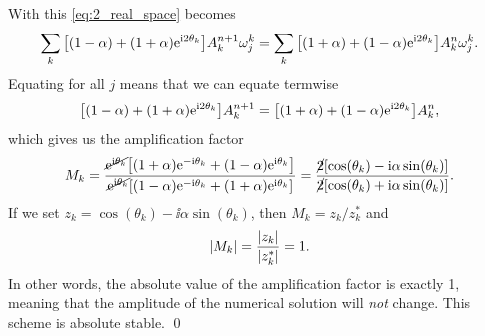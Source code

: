 \documentclass[11pt,letter, swedish, english
]{article}
\begin{document}
With this \eqref{eq:2_real_space} becomes
\begin{equation}
\sum_k\qty[(1-\alpha)+(1+\alpha)\mathrm{e}^{\mathrm{i}2\theta_k}]
A_k^{n+1}\omega_j^k
=\sum_k\qty[(1+\alpha)+(1-\alpha)\mathrm{e}^{\mathrm{i}2\theta_k}]
A_k^{n}\omega_j^k.
\end{equation}
Equating for all $j$ means that we can equate termwise
\begin{equation}
\qty[(1-\alpha)+(1+\alpha)\mathrm{e}^{\mathrm{i}2\theta_k}]A_k^{n+1}
=\qty[(1+\alpha)+(1-\alpha)\mathrm{e}^{\mathrm{i}2\theta_k}]A_k^{n},
\end{equation}
which gives us the amplification factor
\begin{equation}
M_k=\frac{\cancel{\mathrm{e}^{\mathrm{i}\theta_k}}
\qty[(1+\alpha)\mathrm{e}^{-\mathrm{i}\theta_k}+(1-\alpha)\mathrm{e}^{\mathrm{i}\theta_k}]}
{\cancel{\mathrm{e}^{\mathrm{i}\theta_k}}
\qty[(1-\alpha)\mathrm{e}^{-\mathrm{i}\theta_k}+(1+\alpha)\mathrm{e}^{\mathrm{i}\theta_k}]}
=\frac{\cancel{2}\qty[\cos(\theta_k)-\mathrm{i}\alpha\sin(\theta_k)]}
{\cancel{2}\qty[\cos(\theta_k)+\mathrm{i}\alpha\sin(\theta_k)]}.
\end{equation}
If we set $z_k=\cos(\theta_k)-\ii\alpha\sin(\theta_k)$, then
$M_k=z_k/z_k^*$ and 
\begin{equation}
\abs{M_k}=\frac{|z_k|}{|z_k^*|}=1.
\end{equation}
In other words, the absolute value of the amplification factor is
exactly 1, meaning that the amplitude of the numerical solution will
\emph{not} change. This scheme is absolute stable. \qed
\end{document}

